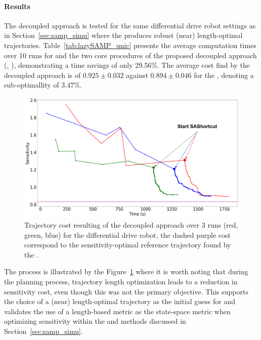 \paragraph{Results}



The decoupled approach is tested for the same differential drive robot settings as in Section~\ref{sec:samp_simu} where the  produces robust (near) length-optimal trajectories.
Table~\ref{tab:lazySAMP_unic} presents the average computation times over 10 runs for  and the two core procedures of the proposed decoupled approach (, ), demonstrating a time savings of only 29.56\%.
The average cost find by the decoupled approach is of $0.925 \pm 0.032$ against $0.894 \pm 0.046$ for the , denoting a sub-optimallity of $3.47\%$.

\begin{figure}[h!]
    \centering
    \includegraphics[width=0.7\linewidth]{figures/samp/sensi_cost_unic.png}
    \caption{Trajectory cost resulting of the decoupled approach over 3 runs (red, green, blue) for the differential drive robot, the dashed purple cost correspond to the sensitivity-optimal reference trajectory found by the .}
    \label{fig:sensi_cost_unic}
\end{figure}

The process is illustrated by the Figure~\ref{fig:sensi_cost_unic} where it is worth noting that during the  planning process, trajectory length optimization leads to a reduction in sensitivity cost, even though this was not the primary objective. 
This supports the choice of a (near) length-optimal trajectory as the initial guess for  and validates the use of a length-based metric as the state-space metric when optimizing sensitivity within the  and  methods discussed in Section~\ref{sec:samp_simu}.

